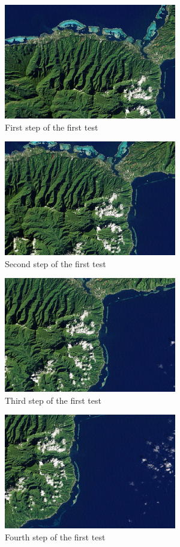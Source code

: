 \documentclass[english,12pt,a4paper,pdftex,elec,utf8]{aaltothesis}
\begin{document}
\begin{figure}[htb]
\centering \includegraphics[height=5cm]{screenshot00.jpg}
\caption{First step of the first test\label{screenshot0Test1}}
\end{figure}

\begin{figure}[htb]
\centering \includegraphics[height=5cm]{screenshot10.jpg}
\caption{Second step of the first test\label{screenshot1Test1}}
\end{figure}

\begin{figure}[htb]
\centering \includegraphics[height=5cm]{screenshot20.jpg}
\caption{Third step of the first test\label{screenshot2Test1}}
\end{figure}

\begin{figure}[htb]
\centering \includegraphics[height=5cm]{screenshot30.jpg}
\caption{Fourth step of the first test\label{screenshot3Test1}}
\end{figure}
\end{document}
